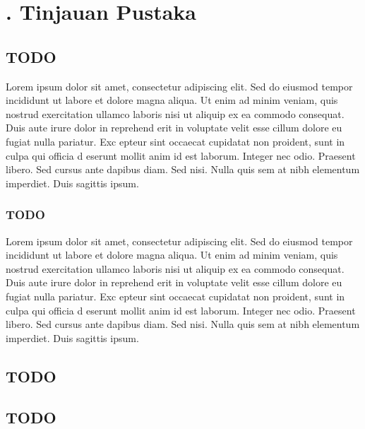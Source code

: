     \newpage

    \setcounter{section}{2}
    \setcounter{subsection}{0}
    {\centering
        \renewcommand{\thesection}{\arabic{section}. }
        \section*{
            \fontsize{\fontChapterTitle}{0}\selectfont
            \thesection Tinjauan Pustaka
        }
    }

    {\subsection{\hspace{\subsectionspace}TODO}}
    Lorem ipsum dolor sit amet, consectetur adipiscing elit. 
    Sed do eiusmod tempor incididunt ut labore et dolore magna aliqua. 
    Ut enim ad minim veniam, quis nostrud exercitation ullamco laboris nisi
    ut aliquip ex ea commodo consequat. Duis aute irure dolor in reprehend
    erit in voluptate velit esse cillum dolore eu fugiat nulla pariatur. Exc
    epteur sint occaecat cupidatat non proident, sunt in culpa qui officia d
    eserunt mollit anim id est laborum. Integer nec odio. Praesent libero.
    Sed cursus ante dapibus diam. Sed nisi. Nulla quis sem at nibh elementum 
    imperdiet. Duis sagittis ipsum.


    \vspace{\vspacesubsec}

    {\subsubsection{\hspace{\subsubsectionspace}TODO}}
    Lorem ipsum dolor sit amet, consectetur adipiscing elit. 
    Sed do eiusmod tempor incididunt ut labore et dolore magna aliqua. 
    Ut enim ad minim veniam, quis nostrud exercitation ullamco laboris nisi
    ut aliquip ex ea commodo consequat. Duis aute irure dolor in reprehend
    erit in voluptate velit esse cillum dolore eu fugiat nulla pariatur. Exc
    epteur sint occaecat cupidatat non proident, sunt in culpa qui officia d
    eserunt mollit anim id est laborum. Integer nec odio. Praesent libero.
    Sed cursus ante dapibus diam. Sed nisi. Nulla quis sem at nibh elementum 
    imperdiet. Duis sagittis ipsum.
    
    \vspace{\vspacesubsec}
    
    \subsection{\hspace{\subsectionspace}TODO}
    \subsection{\hspace{\subsectionspace}TODO}

